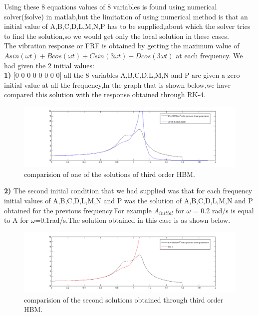 Using these 8 equations values of 8 variables is found using numerical solver(fsolve) in matlab,but the limitation of using numerical method is that an initial value of A,B,C,D,L,M,N,P has to be supplied,about which the solver tries to find the solution,so we would get only the local solution in these cases.\\
The vibration response or FRF is obtained by getting the maximum value of $Asin(\omega t)+Bcos(\omega t)+Csin(3\omega t)+Dcos(3\omega t) $ at each frequency.
We had given the 2 initial values:\\
\textbf{1)} [0 0 0 0 0 0 0 0] all the 8 variables A,B,C,D,L,M,N and P are given a zero initial value at all the frequency,In the graph that is shown below,we have compared this solution with the response obtained through RK-4.

\begin{figure}[h!]
\includegraphics[width=\textwidth,height=0.5\textwidth]{"figures/nonlinearity_primaryymass_3rdorder_2"}
\caption{ comparision of one of the solutions of third order HBM.}
  \label{fig:hbm}
\end{figure}

\textbf{2)} The second initial condition that we had supplied was that for each frequency initial values of A,B,C,D,L,M,N and P was the solution of A,B,C,D,L,M,N and P obtained for the previous frequency.For example $A_{initial}$ for $\omega$ = 0.2 rad/s is equal to A for $\omega$=0.1rad/s.The solution obtained in this case is as shown below.
\begin{figure}[h!]
\includegraphics[width=\textwidth,height=0.5\textwidth]{"figures/nonlinearity_primaryymass_3rdorder"}
\caption{ comparision  of the second solutions obtained through third order HBM.}
  \label{fig:hbm}
\end{figure}

